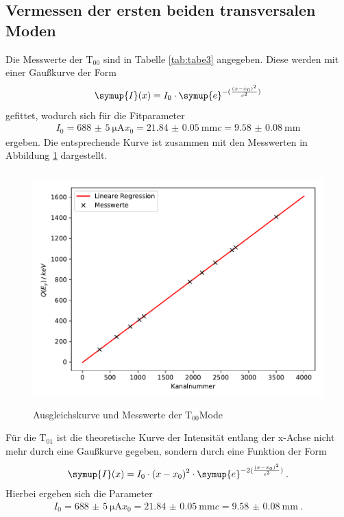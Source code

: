 \subsection{Vermessen der ersten beiden transversalen Moden}
Die Messwerte der $\text{T}_{00}$ sind in Tabelle \ref{tab:tabe3} angegeben. Diese werden
mit einer Gaußkurve der Form
\begin{equation}
  \symup{I}(x) =I_0\cdot \symup{e}^{-(\frac{(x-x_0)^2}{c^2})}
  \label{eqn:gausk}
\end{equation}
gefittet, wodurch sich für die Fitparameter
\begin{align*}
  I_0 = \SI{688(5)}{\micro\ampere}
  x_0 = \SI{21.84(5)}{\milli\meter}
  c = \SI{9.58(8)}{\milli\meter}
\end{align*}
ergeben. Die entsprechende Kurve ist zusammen mit den Messwerten in Abbildung \ref{fig:plot3}
dargestellt.
\begin{figure}
  \centering
  \includegraphics[height=9cm]{Plot3.pdf}
  \caption{Ausgleichskurve und Messwerte der $\text{T}_{00}$Mode}
  \label{fig:plot3}
\end{figure}
Für die $\text{T}_{01}$ ist die theoretische Kurve der Intensität entlang der x-Achse nicht mehr
durch eine Gaußkurve gegeben, sondern durch eine Funktion der Form
\begin{equation}
  \symup{I}(x) =I_0\cdot(x-x_0)^2 \cdot \symup{e}^{-2(\frac{(x-x_0)^2}{c^2})} \: .
  \label{eqn:gausk}
\end{equation}
Hierbei ergeben sich die Parameter
\begin{align*}
  I_0 = \SI{688(5)}{\micro\ampere}
  x_0 = \SI{21.84(5)}{\milli\meter}
  c = \SI{9.58(8)}{\milli\meter} \: .
\end{align*}

